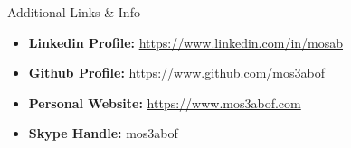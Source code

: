 \documentclass[]{mosabcv}
\begin{document}
	\begin{cvsection}{Additional Links \& Info}
		\begin{cvsubsection}{}{}{}	
			\begin{itemize}
				\item \textbf{Linkedin Profile:} \href{https://www.linkedin.com/in/mosab}{https://www.linkedin.com/in/mosab}
				\item \textbf{Github Profile:} \href{https://www.github.com/mos3abof}{https://www.github.com/mos3abof}
				\item \textbf{Personal Website:} \href{https://www.mos3abof.com}{https://www.mos3abof.com}
				\item \textbf{Skype Handle:} mos3abof
			\end{itemize}
		\end{cvsubsection}
	\end{cvsection}
\end{document}
